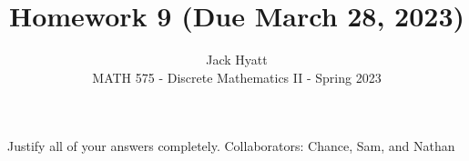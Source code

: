 \documentclass[12pt]{article}
\begin{document}
	
	
	
	\title{Homework 9 (Due March 28, 2023)}
	\author{Jack Hyatt\\ %
		MATH 575 - Discrete Mathematics II - Spring 2023} 
	
	\maketitle
	
	Justify all of your answers completely.\m
 	\text{ }\text{ }\text{ }\text{ }\text{ } Collaborators: Chance, Sam, and Nathan
	
	
	\medskip 
	
\end{document}

